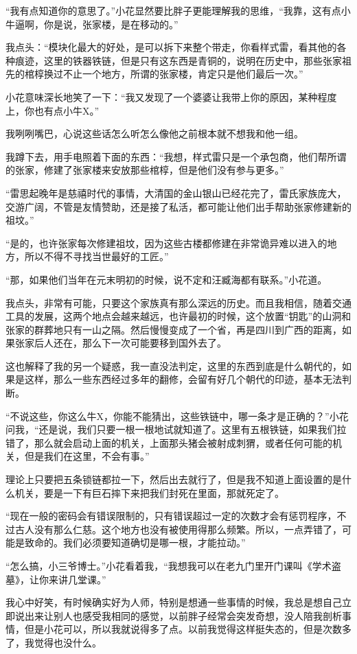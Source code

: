 “我有点知道你的意思了。”小花显然要比胖子更能理解我的思维，“我靠，这有点小牛逼啊，你是说，张家楼，是在移动的。”

我点头：“模块化最大的好处，是可以拆下来整个带走，你看样式雷，看其他的各种痕迹，这里的铁器铁链，但是只有这东西是青铜的，说明在历史中，那些张家祖先的棺椁换过不止一个地方，所谓的张家楼，肯定只是他们最后一次。”

小花意味深长地笑了一下：“我又发现了一个婆婆让我带上你的原因，某种程度上，你也有点小牛X。”

我咧咧嘴巴，心说这些话怎么听怎么像他之前根本就不想我和他一组。

我蹲下去，用手电照着下面的东西：“我想，样式雷只是一个承包商，他们帮所谓的张家，修建了张家楼来安放那些棺椁，但是他们没有参与更多。”

“雷思起晚年是慈禧时代的事情，大清国的金山银山已经花完了，雷氏家族庞大，交游广阔，不管是友情赞助，还是接了私活，都可能让他们出手帮助张家修建新的祖坟。”

“是的，也许张家每次修建祖坟，因为这些古楼都修建在非常诡异难以进入的地方，所以不得不寻找当世最好的工匠。”

“那，如果他们当年在元末明初的时候，说不定和汪臧海都有联系。”小花道。

我点头，非常有可能，只要这个家族真有那么深远的历史。而且我相信，随着交通工具的发展，这两个地点会越来越远，也许最初的时候，这个放置“钥匙”的山洞和张家的群葬地只有一山之隔。然后慢慢变成了一个省，再是四川到广西的距离，如果张家后人还在，那么下一次可能要移到国外去了。

这也解释了我的另一个疑惑，我一直没法判定，这里的东西到底是什么朝代的，如果是这样，那么一些东西经过多年的翻修，会留有好几个朝代的印迹，基本无法判断。

“不说这些，你这么牛X，你能不能猜出，这些铁链中，哪一条才是正确的？”小花问我，“还是说，我们只要一根一根地试就知道了。这里有五根铁链，如果我们拉错了，那么就会启动上面的机关，上面那头猪会被射成刺猬，或者任何可能的机关，但是我们在这里，不会有事。”

理论上只要把五条锁链都拉一下，然后出去就行了，但是我不知道上面设置的是什么机关，要是一下有巨石摔下来把我们封死在里面，那就死定了。

“现在一般的密码会有错误限制的，只有错误超过一定的次数才会有惩罚程序，不过古人没有那么仁慈。这个地方也没有被使用得那么频繁。所以，一点弄错了，可能是致命的。我们必须要知道确切是哪一根，才能拉动。”

“怎么搞，小三爷博士。”小花看着我，“我想我可以在老九门里开门课叫《学术盗墓》，让你来讲几堂课。”

我心中好笑，有时候确实好为人师，特别是想通一些事情的时候，我总是想自己立即说出来让别人也感受我相同的感觉，以前胖子经常会突发奇想，没人陪我剖析事情，但是小花可以，所以我就说得多了点。以前我觉得这样挺失态的，但是次数多了，我觉得也没什么。

